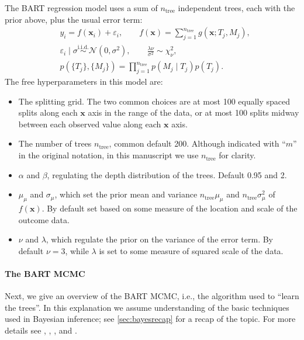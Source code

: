 \documentclass{article}
\begin{document}
The BART regression model uses a sum of $n_\text{tree}$ independent trees, each
with the prior above, plus the usual error term:
%
\begin{align}
	 &
	y_i = f(\mathbf x_i) + \varepsilon_i
	, \qquad
	f(\mathbf x) = \sum_{j=1}^{n_\text{tree}} g(\mathbf x; T_j, M_j)
	, \label{eq:bartdef} \\
	 &
	\varepsilon_i \mid\sigma \overset{\mathrm{i.i.d.}}\sim \mathcal N(0, \sigma^2)
	, \qquad
	\frac{\lambda\nu}{\sigma^2} \sim \chi^2_\nu
	,                    \\
	 &
	p(\{T_j\}, \{M_j\}) = \prod_{j=1}^{n_\text{tree}} p(M_j \mid T_j) p(T_j).
	\label{eq:bartdef2}
\end{align}
%
The free hyperparameters in this model are:
%
\begin{itemize}

	\item The splitting grid. The two common choices are at most 100
		equally spaced splits along each $\mathbf x$ axis in the range
		of the data, or at most 100 splits midway between each observed
		value along each $\mathbf x$ axis.

	\item The number of trees $n_\text{tree}$, common default 200. Although
		indicated with ``$m$'' in the original notation, in this
		manuscript we use $n_\text{tree}$ for clarity.

	\item $\alpha$ and $\beta$, regulating the depth distribution of the
	      trees. Default 0.95 and 2.

	\item $\mu_\mu$ and $\sigma_\mu$, which set the prior mean and variance
		$n_\text{tree}\mu_\mu$ and $n_\text{tree}\sigma_\mu^2$ of
		$f(\mathbf x)$. By default set based on some measure of the
		location and scale of the outcome data.

	\item $\nu$ and $\lambda$, which regulate the prior on the variance of
		the error term. By default $\nu=3$, while $\lambda$ is set to
		some measure of squared scale of the data.

\end{itemize}

\paragraph{The BART MCMC}

Next, we give an overview of the BART MCMC, i.e., the algorithm used to ``learn
the trees''. In this explanation we assume understanding of the basic techniques
used in Bayesian inference; see \autoref{sec:bayesrecap} for a recap of the
topic. For more details see \citet{chipman1998,chipman2010}, \citet[\S
	A]{kapelner2016}, \citet[ch.~5]{daniels2023}, and \citet[\S2.1.4,
	p.~5]{tan2019}.
\end{document}
